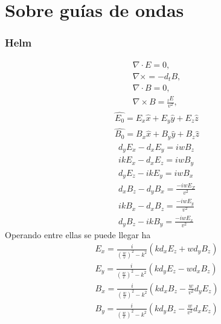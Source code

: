 \chapter{Sobre guías de ondas}

\subsection{Helm}
\begin{subequations}\label{Maxwell}
	\begin{align}
	\nabla \cdot E = 0,\label{Primera}\\
	\nabla \times = - d_{t} B,\label{segunda}\\
	\nabla \cdot B = 0,\label{tercera}\\
	\nabla \times B=  \frac{_{t} E}{v^2},\label{cuarta}
	\end{align}
\end{subequations}
\begin{subequations}\label{Camposincidentes}
	\begin{align}
\hat{E_{0}} = E_{x}\hat{x} + E_{y}\hat{y}+E_{z}\hat{z} \\
\hat{B_{0}} = B_{x}\hat{x} + B_{y}\hat{y}+B_{z}\hat{z}
	\end{align}
\end{subequations}
\begin{subequations}\label{Camposexplicitos}
	\begin{align}
d_{y}E_{x}-d_{x}E_{y}= i w B_{z} \\
i k E_{x}-d_{x}E_{z}= i w B_{y} \\
d_{y}E_{z}-i k E_{y}= i w B_{x} \\
d_{x}B_{z}-d_{y}B_{x}= \frac{-iw E_{Z} }{v^2} \\
i k B_{x}-d_{x}B_{z}= \frac{-iw E_{y} }{v^2} \\
d_{y}B_{z}- i k B_{y}= \frac{-iw E_{x} }{v^2} 
	\end{align}
\end{subequations}
Operando entre ellas se puede llegar ha
\begin{subequations}\label{Ecuacionesdecampo}
	\begin{align}
	E_{x} = \frac{i}{(\frac{w}{v})^2 - k^2} (k d_{x}E_{z}+w d_{y} B_{z}) \\
	E_{y} = \frac{i}{(\frac{w}{v})^2 - k^2} (k d_{y}E_{z}-w d_{x} B_{z}) \\
	B_{x} = \frac{i}{(\frac{w}{v})^2 - k^2} (k d_{x}B_{z}- \frac{w}{v^2} d_{y} E_{z}) \\
	B_{y} = \frac{i}{(\frac{w}{v})^2 - k^2} (k d_{y}B_{z}- \frac{w}{v^2} d_{x} E_{z}) 
	\end{align}
\end{subequations}
